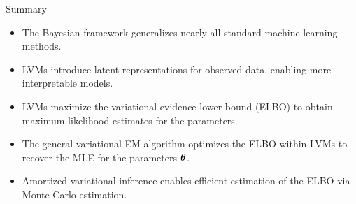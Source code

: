 \documentclass{beamer}
\begin{document}
\begin{frame}{Summary}
	\begin{itemize}
		\item The Bayesian framework generalizes nearly all standard machine learning methods.
		\vfill
		\item LVMs introduce latent representations for observed data, enabling more interpretable models.
		\vfill
		\item LVMs maximize the variational evidence lower bound (ELBO) to obtain maximum likelihood estimates for the parameters.
		\vfill
		\item The general variational EM algorithm optimizes the ELBO within LVMs to recover the MLE for the parameters $\boldsymbol{\theta}$.
		\vfill
		\item Amortized variational inference enables efficient estimation of the ELBO via Monte Carlo estimation.
	\end{itemize}
\end{frame}
\end{document}
